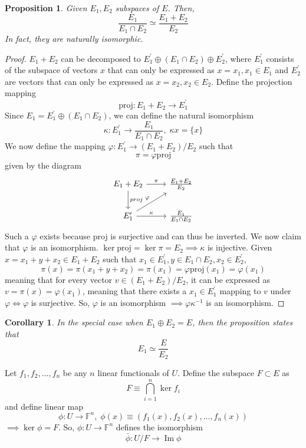 \documentclass{article}
\DeclareMathOperator{\im}{Im}
\newtheorem{proposition}[theorem]{Proposition}
\newtheorem{corollary}{Corollary}[theorem]
\theoremstyle{remark}
\theoremstyle{definition}
\begin{document}
\begin{proposition}
Given $E_1, E_2$ subspaces of $E$. Then, 
\[\frac{E_1}{E_1 \cap E_2} \simeq \frac{E_1 + E_2}{E_2}\]
In fact, they are naturally isomorphic. 
\end{proposition}
\begin{proof}
$E_1 + E_2$ can be decomposed to $E_1^\prime \oplus (E_1 \cap E_2) \oplus E_2^\prime$, where $E_1^\prime$ consists of the subspace of vectors $x$ that can only be expressed as $x = x_1, x_1 \in E_1$ and $E_2^\prime$ are vectors that can only be expressed as $x = x_2, x_2 \in E_2$. Define the projection mapping
\[\text{proj}: E_1 + E_2 \longrightarrow E_1^\prime\]
Since $E_1 = E_1^\prime \oplus (E_1 \cap E_2)$, we can define the natural isomorphism 
\[\kappa: E_1^\prime \longrightarrow \frac{E_1}{E_1 \cap E_2}, \; \kappa{x} = \{x\}\]
We now define the mapping $\varphi: E_1^\prime \longrightarrow (E_1 + E_2) / E_2$ such that
\[\pi = \varphi \text{proj}\]
given by the diagram 
\[\begin{tikzcd} 
    E_1 + E_2 \arrow{d}{proj} \arrow{r}{\pi} & \frac{E_1 + E_2}{E_2} \\
    E_1^\prime \arrow{ru}{\varphi} \arrow{r}{\kappa} & \frac{E_1}{E_1 \cap E_2}
\end{tikzcd}\]
Such a $\varphi$ exists because proj is surjective and can thus be inverted. We now claim that $\varphi$ is an isomorphism. $\ker{\text{proj}} = \ker{\pi} = E_2 \implies \kappa$ is injective. Given $x = x_1 + y + x_2 \in E_1 + E_2$ such that $x_1 \in E_1^\prime, y \in E_1 \cap E_2, x_2 \in E_2^\prime$, 
\[\pi(x) = \pi(x_1 + y + x_2) = \pi(x_1) = \varphi \text{proj} (x_1) = \varphi (x_1)\]
meaning that for every vector $v \in (E_1 + E_2) / E_2$, it can be expressed as $v = \pi (x) = \varphi (x_1)$, meaning that there exists a $x_1 \in E_1^\prime$ mapping to $v$ under $\varphi \iff \varphi$ is surjective. So, $\varphi$ is an isomorphism $\implies \varphi \kappa^{-1}$ is an isomorphism.  
\end{proof}

\begin{corollary}
In the special case when $E_1 \oplus E_2 = E$, then the proposition states that 
\[E_1 \simeq \frac{E}{E_2}\]
\end{corollary}

Let $f_1, f_2, ..., f_n$ be any $n$ linear functionals of $U$. Define the subspace $F \subset E$ as 
\[ F \equiv \bigcap_{i=1}^n \ker{f_i}\]
and define linear map 
\[\phi: U \longrightarrow \mathbb{F}^n, \;\phi(x) \equiv (f_1(x), f_2(x), ..., f_n(x))\]
$\implies \ker{\phi} = F$. So, $\phi: U \longrightarrow \mathbb{F}^n$ defines the isomorphism 
\[\bar{\phi}: U / F \longrightarrow \im{\phi}\]
\end{document}
